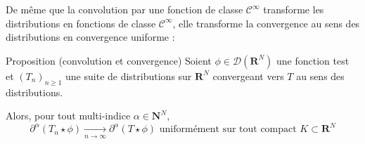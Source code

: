         De même que la convolution par une fonction de classe $\mathcal{C}^{\infty}$ transforme les distributions en fonctions de classe $\mathcal{C}^{\infty}$, elle transforme la convergence au sens des distributions en convergence uniforme :

        \begin{omed}{Proposition (convolution et convergence)}
            Soient $\phi \in \mathcal{D}(\mathbf{R}^N)$ une fonction test et $(T_n)_{n \geq 1}$ une suite de distributions sur $\mathbf{R}^N$ convergeant vers $T$ au sens des distributions. 

            Alors, pour tout multi-indice $\alpha \in \mathbf{N}^N$, 
            \[ \partial^{\alpha} (T_n \star \phi) \underset{n \to \infty}{\longrightarrow} \partial^{\alpha} (T \star \phi) \text{ uniformément sur tout compact } K \subset \mathbf{R}^N \]
        \end{omed}

